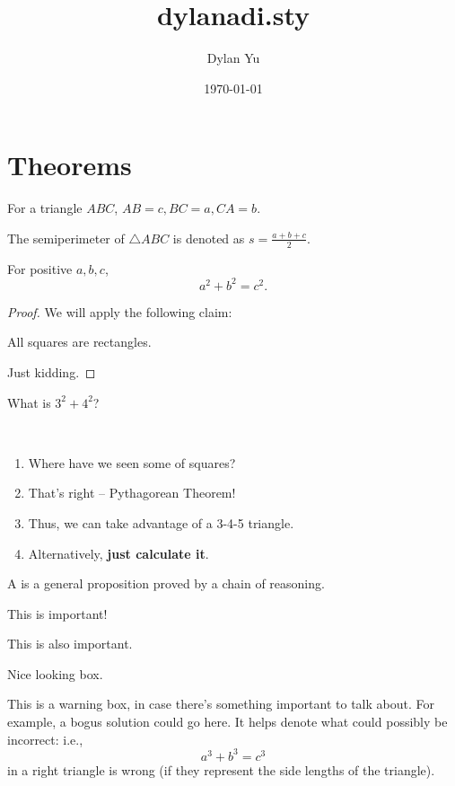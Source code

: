 \documentclass[11pt]{scrartcl}
\title{dylanadi.sty}
\author{Dylan Yu}
\date{\today}
\begin{document}
\dylantitle
\tableofcontents

\section{Theorems}
\begin{notation}
\item For a triangle $ABC$, $AB=c,BC=a,CA=b$.
\item The semiperimeter of $\triangle ABC$ is denoted as $s=\frac{a+b+c}{2}$.
\end{notation}
\begin{theorem}
For positive $a,b,c$, 
$$a^2+b^2=c^2.$$
\end{theorem}
\begin{proof}
We will apply the following claim:
\begin{claim}
All squares are rectangles.
\end{claim}
Just kidding.
\end{proof}
\begin{example}
What is $3^2+4^2$?
\end{example}
\begin{walk}~
\begin{enumerate}
    \item Where have we seen some of squares?
    \item That's right -- Pythagorean Theorem!
    \item Thus, we can take advantage of a 3-4-5 triangle.
    \item Alternatively, \textbf{just calculate it}.
\end{enumerate}
\end{walk}
\begin{defn}[Theorem]
A  is a general proposition proved by a chain of reasoning.
\end{defn}
\begin{fact}
This is important!
\end{fact}
\begin{remark}
This is also important.
\end{remark}
\begin{boxpar}[Paragraph]
Nice looking box.
\end{boxpar}
\begin{caution}
This is a warning box, in case there's something important to talk about. For example, a bogus solution could go here. It helps denote what could possibly be incorrect: i.e.,
$$a^3+b^3=c^3$$
in a right triangle is wrong (if they represent the side lengths of the triangle).
\end{caution}
\end{document}
